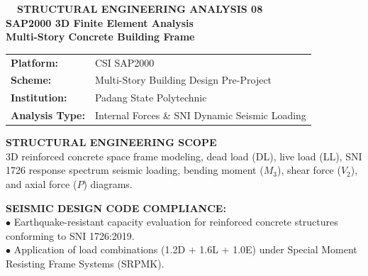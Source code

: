 \documentclass[10pt,a4paper,landscape]{article}
\begin{document}
\noindent
\begin{minipage}[t]{0.30\linewidth}
  \vspace{0pt}
  \begin{tcolorbox}[sharp corners, boxrule=0.8pt, colframe=pborder, colback=white, left=3mm, right=3mm, top=2.5mm, bottom=2.5mm, height=100mm]
    \colorbox{pred}{\fontsize{7pt}{8pt}\selectfont\bfseries\color{white}\ \ STRUCTURAL ENGINEERING ANALYSIS 08\ \ }\\[1.5mm]
    {\fontsize{9.5pt}{11.5pt}\selectfont\bfseries\color{pnavy}SAP2000 3D Finite Element Analysis}\\[0.5mm]
    {\fontsize{7pt}{8.5pt}\selectfont\bfseries\color{pred}Multi-Story Concrete Building Frame}\\[2mm]

    \begin{tcolorbox}[sharp corners, boxrule=0.5pt, colframe=pborder, colback=pbglight, left=2mm, right=2mm, top=1.5mm, bottom=1.5mm]
      \begin{tabularx}{\linewidth}{@{}p{22mm} X@{}}
        {\fontsize{6.8pt}{8pt}\selectfont\bfseries Platform:} & {\fontsize{6.8pt}{8pt}\selectfont CSI SAP2000} \\[0.8mm]
        {\fontsize{6.8pt}{8pt}\selectfont\bfseries Scheme:} & {\fontsize{6.8pt}{8pt}\selectfont Multi-Story Building Design Pre-Project} \\[0.8mm]
        {\fontsize{6.8pt}{8pt}\selectfont\bfseries Institution:} & {\fontsize{6.8pt}{8pt}\selectfont Padang State Polytechnic} \\[0.8mm]
        {\fontsize{6.8pt}{8pt}\selectfont\bfseries Analysis Type:} & {\fontsize{6.8pt}{8pt}\selectfont Internal Forces \& SNI Dynamic Seismic Loading}
      \end{tabularx}
    \end{tcolorbox}
    \vspace{1.5mm}

    {\fontsize{7.5pt}{9pt}\selectfont\bfseries\color{pnavy}STRUCTURAL ENGINEERING SCOPE}\\[0.8mm]
    {\fontsize{6.5pt}{8.2pt}\selectfont\color{psteel}
    3D reinforced concrete space frame modeling, dead load (DL), live load (LL), SNI 1726 response spectrum seismic loading, bending moment ($M_3$), shear force ($V_2$), and axial force ($P$) diagrams.
    }
  \end{tcolorbox}
  \vspace{2mm}

  \begin{tcolorbox}[sharp corners, boxrule=0.6pt, colframe=pnavy, colback=pbglight, left=2.5mm, right=2.5mm, top=2mm, bottom=2mm, height=52mm]
    {\fontsize{7pt}{8.5pt}\selectfont\bfseries\color{pnavy}SEISMIC DESIGN CODE COMPLIANCE:}\\[1.5mm]
    {\fontsize{6.5pt}{8.2pt}\selectfont\color{psteel}
    $\bullet$ Earthquake-resistant capacity evaluation for reinforced concrete structures conforming to SNI 1726:2019.\\
    $\bullet$ Application of load combinations (1.2D + 1.6L + 1.0E) under Special Moment Resisting Frame Systems (SRPMK).
    }
  \end{tcolorbox}
\end{minipage}%
\end{document}
